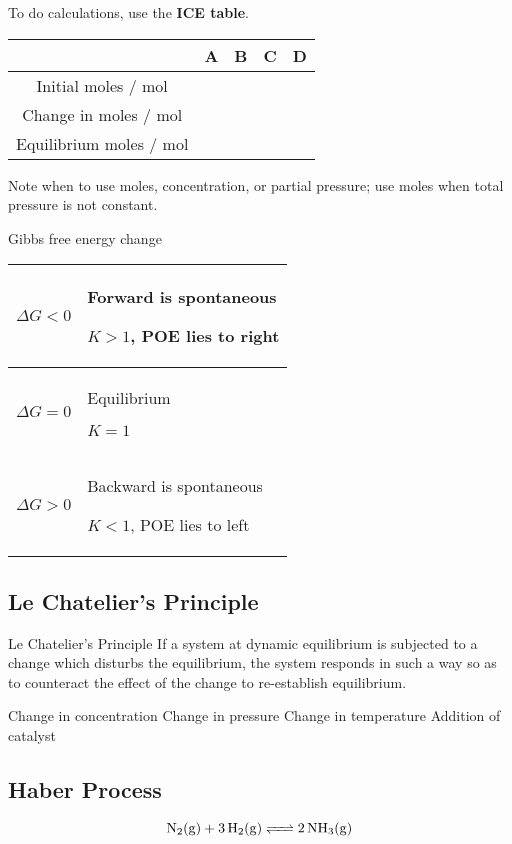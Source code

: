 To do calculations, use the \textbf{ICE table}.
\begin{table}[H]
\centering
\begin{tabular}{|c|c|c|c|c|}
\hline
& A & B & C & D \\
\hline
Initial moles / mol & & & & \\
\hline
Change in moles / mol & & & & \\
\hline
Equilibrium moles / mol & & & & \\
\hline
\end{tabular}
\end{table}

\begin{remark}
Note when to use moles, concentration, or partial pressure; use moles when total pressure is not constant.
\end{remark}

Gibbs free energy change
\begin{table}[H]
\centering
\begin{tabular}{|p{2cm}|p{11cm}|}
\hline
$\Delta G<0$ & Forward is spontaneous

$K > 1$, POE lies to right \\
\hline
$\Delta G=0$ & Equilibrium

$K = 1$ \\
\hline
$\Delta G>0$ & Backward is spontaneous

$K < 1$, POE lies to left \\
\hline
\end{tabular}
\end{table}

\subsection{Le Chatelier's Principle}

\begin{defn}{Le Chatelier’s Principle}{}
If a system at dynamic equilibrium is subjected to a change which disturbs the equilibrium, the system responds in such a way so as to counteract the effect of the change to re-establish equilibrium.
\end{defn}

Change in concentration
Change in pressure
Change in temperature
Addition of catalyst

\subsection{Haber Process}
\[ \ce{N2(g) + 3 H2(g) <=> 2 NH3(g)} \]

